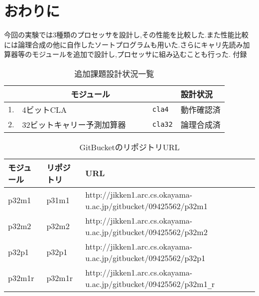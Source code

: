 \documentclass[11pt,a4j]{jarticle}
\begin{document}
\section{おわりに}
今回の実験では3種類のプロセッサを設計し,その性能を比較した.また性能比較には論理合成の他に自作したソートプログラムも用いた.さらにキャリ先読み加算器等のモジュールを追加で設計し,プロセッサに組み込むことも行った.
\appendix
{\Large \gt 付録}
\begin{table}[htb]
\caption{追加課題設計状況一覧}
\begin{center}
\begin{tabular}{rll|l}
\hline
\hline
\multicolumn{3}{c|}{モジュール} & 設計状況 \\
\hline
1. & 4ビットCLA      　 & \verb|cla4|          & 動作確認済 \\
2. & 32ビットキャリー予測加算器 　　& \verb|cla32|         & 論理合成済 \\
\hline
\end{tabular}
\end{center}
\end{table}
\begin{table}[htb]
\caption{GitBucketのリポジトリURL}
\begin{center}
\begin{tabular}{|l|l|l|}
\hline
モジュール & リポジトリ & URL \\
\hline\hline
p32m1 & p31m1 & http://jikken1.arc.cs.okayama-u.ac.jp/gitbucket/09425562/p32m1 \\ \hline
p32m2 & p32m2 & http://jikken1.arc.cs.okayama-u.ac.jp/gitbucket/09425562/p32m2 \\ \hline
p32p1 & p32p1 & http://jikken1.arc.cs.okayama-u.ac.jp/gitbucket/09425562/p32p1 \\ \hline
p32m1r & p32m1r & http://jikken1.arc.cs.okayama-u.ac.jp/gitbucket/09425562/p32m1\verb|_|r \\ \hline
\end{tabular}
\end{center}
\end{table}
\end{document}
